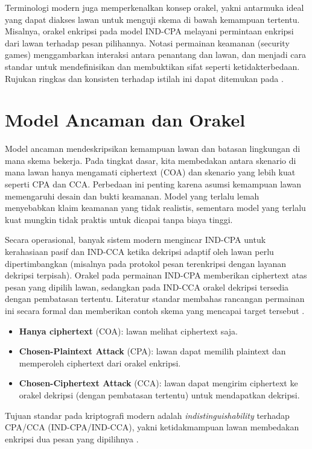 \documentclass[../main.tex]{subfiles}
\begin{document}
Terminologi modern juga memperkenalkan konsep orakel, yakni antarmuka ideal yang dapat diakses lawan untuk menguji skema di bawah kemampuan tertentu. Misalnya, orakel enkripsi pada model IND-CPA melayani permintaan enkripsi dari lawan terhadap pesan pilihannya. Notasi permainan keamanan (security games) menggambarkan interaksi antara penantang dan lawan, dan menjadi cara standar untuk mendefinisikan dan membuktikan sifat seperti ketidakterbedaan. Rujukan ringkas dan konsisten terhadap istilah ini dapat ditemukan pada \citep{bellare_rogaway_notes,katzlindell}.

\section{Model Ancaman dan Orakel}
Model ancaman mendeskripsikan kemampuan lawan dan batasan lingkungan di mana skema bekerja. Pada tingkat dasar, kita membedakan antara skenario di mana lawan hanya mengamati ciphertext (COA) dan skenario yang lebih kuat seperti CPA dan CCA. Perbedaan ini penting karena asumsi kemampuan lawan memengaruhi desain dan bukti keamanan. Model yang terlalu lemah menyebabkan klaim keamanan yang tidak realistis, sementara model yang terlalu kuat mungkin tidak praktis untuk dicapai tanpa biaya tinggi.

Secara operasional, banyak sistem modern mengincar IND-CPA untuk kerahasiaan pasif dan IND-CCA ketika dekripsi adaptif oleh lawan perlu dipertimbangkan (misalnya pada protokol pesan terenkripsi dengan layanan dekripsi terpisah). Orakel pada permainan IND-CPA memberikan ciphertext atas pesan yang dipilih lawan, sedangkan pada IND-CCA orakel dekripsi tersedia dengan pembatasan tertentu. Literatur standar membahas rancangan permainan ini secara formal dan memberikan contoh skema yang mencapai target tersebut \citep{katzlindell,bonehshoup,bellare_rogaway_notes}.
\begin{itemize}
  \item \textbf{Hanya ciphertext} (COA): lawan melihat ciphertext saja.
  \item \textbf{Chosen-Plaintext Attack} (CPA): lawan dapat memilih plaintext dan memperoleh ciphertext dari orakel enkripsi.
  \item \textbf{Chosen-Ciphertext Attack} (CCA): lawan dapat mengirim ciphertext ke orakel dekripsi (dengan pembatasan tertentu) untuk mendapatkan dekripsi.
\end{itemize}
Tujuan standar pada kriptografi modern adalah \emph{indistinguishability} terhadap CPA/CCA (IND-CPA/IND-CCA), yakni ketidakmampuan lawan membedakan enkripsi dua pesan yang dipilihnya \citep{katzlindell,bonehshoup}.
\end{document}
